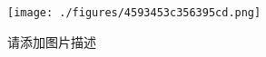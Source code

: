
\begin{figure}[ht]
\centering
\texttt{[image: ./figures/4593453c356395cd.png]}
\caption{请添加图片描述} \label{fig_test2_6}
\end{figure}